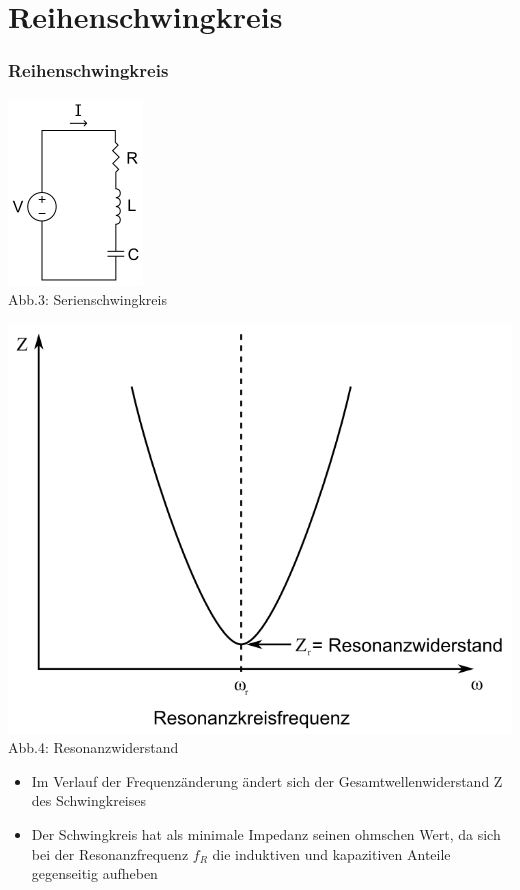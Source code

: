 \section*{Reihenschwingkreis}
\begin{frame}
\frametitle{Reihenschwingkreis}
\begin{center}
	\begin{minipage}{0.4\textwidth}
	\includegraphics[scale=0.8]{e07/Serirenschw.png}\\
	\tiny{Abb.3: Serienschwingkreis \cite{wmen}}
	\end{minipage}
	\begin{minipage}{0.4\textwidth}
	\includegraphics[scale=0.2]{e07/SerirenschwSig.png}\\
	\tiny{Abb.4: Resonanzwiderstand \cite{wmen}} 
	\end{minipage}
\end{center}
\begin{itemize}
	\item Im Verlauf der Frequenzänderung ändert sich der Gesamtwellenwiderstand Z des Schwingkreises
	\item Der Schwingkreis hat als minimale Impedanz seinen ohmschen Wert, da sich bei der Resonanzfrequenz $f_R$ die induktiven und kapazitiven Anteile gegenseitig aufheben
\end{itemize}
\end{frame}


